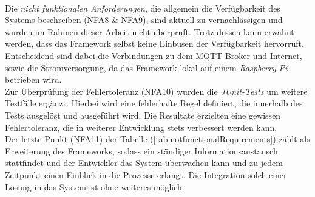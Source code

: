         \\
        \linebreak
        Die \textit{nicht funktionalen Anforderungen}, die allgemein die Verfügbarkeit des Systems beschreiben (NFA8 \& NFA9), sind aktuell zu vernachlässigen und wurden im Rahmen dieser 
        Arbeit nicht überprüft. Trotz dessen kann erwähnt werden, dass das Framework selbst keine Einbusen der Verfügbarkeit hervorruft. Entscheidend sind dabei die 
        Verbindungen zu dem \acs{MQTT}-Broker und Internet, sowie die Stromversorgung, da das Framework lokal auf einem \textit{Raspberry Pi} betrieben wird. 
        \\
        \linebreak
        Zur Überprüfung der Fehlertoleranz (NFA10) wurden die \textit{JUnit-Tests} um weitere Testfälle ergänzt. Hierbei wird eine fehlerhafte Regel definiert, die innerhalb des 
        Tests ausgelöst und ausgeführt wird. Die Resultate erzielten eine gewissen Fehlertoleranz, die in weiterer Entwicklung stets verbessert werden kann.
        \\
        \linebreak
        Der letzte Punkt (NFA11) der Tabelle (\ref{tab:notfunctionalRequirements}) zählt als Erweiterung des Frameworks, sodass ein ständiger Informationsaustausch stattfindet und der 
        Entwickler das System überwachen kann und zu jedem Zeitpunkt einen Einblick in die Prozesse erlangt. Die Integration solch einer Lösung in das System ist ohne weiteres möglich.
    
